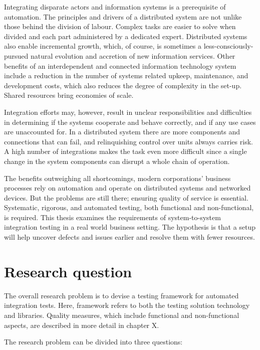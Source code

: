 \documentclass[12pt,a4paper,oneside,pdftex]{report}
\begin{document}
Integrating disparate actors and information systems is a prerequisite of automation. The principles and drivers of  a distributed system are not unlike those behind the division of labour. Complex tasks are easier to solve when divided and each part administered by a dedicated expert. Distributed systems also enable incremental growth, which, of course, is sometimes a less-consciously-pursued natural evolution and accretion of new information services. Other benefits of an interdependent and connected information technology system include a reduction in the number of systems related upkeep, maintenance, and development costs, which also reduces the degree of complexity in the set-up. Shared resources bring economies of scale.

Integration efforts may, however, result in unclear responsibilities and difficulties in determining if the systems cooperate and behave correctly, and if any use cases are unaccounted for. In a distributed system there are more components and connections that can fail, and relinquishing control over units always carries risk. A high number of integrations makes the task even more difficult since a single change in the system components can disrupt a whole chain of operation.

The benefits outweighing all shortcomings, modern corporations' business processes rely on automation and operate on distributed systems and networked devices. But the problems are still there; ensuring quality of service is essential. Systematic, rigorous, and automated testing, both functional and non-functional, is required. This thesis examines the requirements of system-to-system integration testing in a real world business setting. The hypothesis is that a setup will help uncover defects and issues earlier and resolve them with fewer resources.

\section{Research question}

The overall research problem is to devise a testing framework for automated integration tests. Here, framework refers to both the testing solution technology and libraries. Quality measures, which include functional and non-functional aspects, are described in more detail in chapter X. %

The research problem can be divided into three questions: \\
\end{document}
